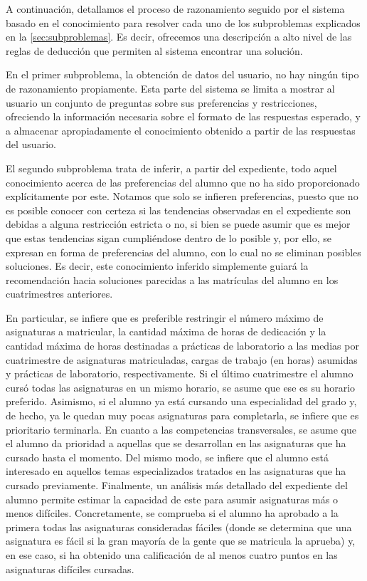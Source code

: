 A continuación, detallamos el proceso de razonamiento seguido por el sistema 
basado en el conocimiento para resolver cada uno de los subproblemas 
explicados en la \autoref{sec:subproblemas}. Es decir, ofrecemos una 
descripción a alto nivel de las reglas de deducción que permiten al sistema 
encontrar una solución.

En el primer subproblema, la obtención de datos del usuario, no hay ningún
tipo de razonamiento propiamente. Esta parte del sistema se limita a mostrar 
al usuario un conjunto de preguntas sobre sus preferencias y restricciones, 
ofreciendo la información necesaria sobre el formato de las respuestas 
esperado, y a almacenar apropiadamente el conocimiento obtenido a partir de 
las respuestas del usuario.

El segundo subproblema trata de inferir, a partir del expediente, 
todo aquel conocimiento acerca de las preferencias del alumno que no ha sido 
proporcionado explícitamente por este. Notamos que solo se infieren 
preferencias, puesto que no es posible conocer con certeza si las tendencias 
observadas en el expediente son debidas a alguna restricción estricta o no, 
si bien se puede asumir que es mejor que estas tendencias sigan cumpliéndose 
dentro de lo posible y, por ello, se expresan en forma de preferencias del 
alumno, con lo cual no se eliminan posibles soluciones. Es decir, este 
conocimiento inferido simplemente guiará la recomendación hacia soluciones 
parecidas a las matrículas del alumno en los cuatrimestres anteriores.

En particular, se infiere que es preferible restringir el número máximo de 
asignaturas a matricular, la cantidad máxima de horas de dedicación y la 
cantidad máxima de horas destinadas a prácticas de laboratorio a las medias 
por cuatrimestre de asignaturas matriculadas, cargas de trabajo (en horas) 
asumidas y prácticas de laboratorio, respectivamente. Si el último 
cuatrimestre el alumno cursó todas las asignaturas en un mismo horario, se 
asume que ese es su horario preferido. Asimismo, si el alumno ya está cursando
una especialidad del grado y, de hecho, ya le quedan muy pocas asignaturas 
para completarla, se infiere que es prioritario terminarla.
En cuanto a las competencias transversales, se asume que el alumno da 
prioridad a aquellas que se desarrollan en las asignaturas que ha cursado 
hasta el momento. Del mismo modo, se infiere que el 
alumno está interesado en aquellos temas especializados tratados en las 
asignaturas que ha cursado previamente. 
Finalmente, un análisis más detallado del expediente del alumno permite 
estimar la capacidad de este para asumir asignaturas más o menos difíciles. 
Concretamente, se comprueba si el alumno ha aprobado a la primera todas las 
asignaturas consideradas fáciles (donde se determina que una asignatura es 
fácil si la gran mayoría de la gente que se matricula la aprueba) y, en ese 
caso, si ha obtenido una calificación de al menos cuatro puntos en las 
asignaturas difíciles cursadas. 

